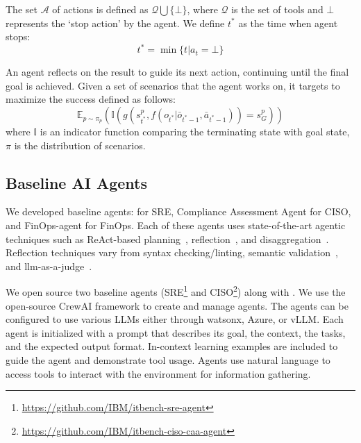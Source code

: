 The set $\mathcal{A}$ of actions is defined as $\mathcal{Q} \bigcup \{\bot\}$, where $\mathcal{Q}$ is the set of tools and $\bot$ represents the `stop action' by the agent. 
We define $t^*$ as the time when agent stops: 
\begin{equation}
    t^*=\min \{t | a_t=\bot \} 
\end{equation}

An agent reflects on the result to guide its next action, continuing until the final goal is achieved. Given a set of scenarios that the agent works on, it targets to maximize the success defined as follows: 
\begin{equation}
    \mathbb{E}_{p \sim \pi_p}(\mathbb{I}(g(s^{p}_{t^*}, f(o_{t^*}|\bar{o}_{t^*-1},\bar{a}_{t^*-1}))=s^p_G))
\end{equation}
where $\mathbb{I}$ is an indicator function comparing the terminating state with goal state, $\pi$ is the distribution of scenarios.  



\subsection{Baseline AI Agents}
We developed baseline agents: \lumyn for SRE, Compliance Assessment Agent for CISO, and FinOps-agent for FinOps.
Each of these agents uses state-of-the-art agentic techniques such as ReAct-based planning~\cite{yao2023react}, reflection~\cite{shinn2023reflexion}, and disaggregation~\cite{xu2023rewoodecouplingreasoningobservations}.
Reflection techniques vary from syntax checking/linting, semantic validation~\cite{xie2024travelplannerbenchmarkrealworldplanning}, and llm-as-a-judge~\cite{zheng2023judgingllmasajudgemtbenchchatbot}.

We open source two baseline agents (SRE\footnote{\url{https://github.com/IBM/itbench-sre-agent}} and CISO\footnote{\url{https://github.com/IBM/itbench-ciso-caa-agent}}) along with \bench. We use the open-source CrewAI framework \cite{crewai} to create and manage agents. The agents can be configured to use various LLMs either through watsonx, Azure, or vLLM. Each agent is initialized with a prompt that describes its goal, the context, the tasks, and the expected output format. In-context learning examples are included to guide the agent and demonstrate tool usage. Agents use natural language to access tools to interact with the environment for information gathering. 

